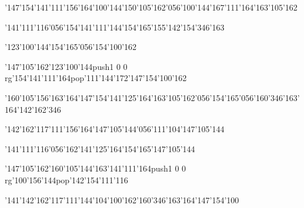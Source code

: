 \null\vfill\ipa\centerline{\enskip\char'147\char'154\char'141\char'111\char'156\char'164\enskip\char'100\char'144\enskip\char'150\char'105\char'162\char'056\char'100\char'144\enskip\enskip\enskip\char'167\char'111\char'164\enskip\char'163\char'105\char'162}\medskip\centerline{\enskip\char'141\char'111\char'116\char'056\char'154\char'141\char'111\char'144\enskip\enskip\enskip\enskip\char'154\char'165\char'155\enskip\enskip\enskip\enskip\enskip\char'142\char'154\char'346\char'163}\medskip\centerline{\enskip\char'123\char'100\char'144\enskip\enskip\enskip\enskip\enskip\enskip\enskip\enskip\enskip\char'154\char'165\char'056\char'154\char'100\char'162}\medskip\centerline{\enskip\enskip\enskip\enskip\char'147\char'105\char'162\enskip\char'123\char'100\char'144\enskip\pdfcolorstack\match push{1 0 0 rg}\char'154\char'141\char'111\char'164\pdfcolorstack\match pop{}\enskip\char'111\char'144\char'172\enskip\char'147\char'154\char'100\char'162}\medskip\centerline{\enskip\enskip\char'160\char'105\char'156\char'163\char'164\enskip\enskip\enskip\char'147\char'154\char'141\char'125\char'164\enskip\char'163\char'105\char'162\char'056\char'154\char'165\char'056\char'160\char'346\char'163\char'164\enskip\char'142\char'162\char'346}\medskip\vfill\footline{\hfil\tt\folio\hfil}\eject
\null\vfill\ipa\centerline{\enskip\char'142\char'162\char'117\char'111\char'156\char'164\enskip\enskip\enskip\enskip\char'147\char'105\char'144\char'056\char'111\char'104\enskip\enskip\enskip\enskip\enskip\enskip\enskip\char'147\char'105\char'144}\medskip\centerline{\enskip\char'141\char'111\char'116\char'056\char'162\char'141\char'125\char'164\enskip\char'154\char'165\enskip\char'147\char'105\char'144\enskip\enskip\enskip\enskip\enskip\enskip\enskip\enskip\enskip}\medskip\centerline{\enskip\enskip\enskip\enskip\enskip\enskip\enskip\enskip\enskip\enskip\enskip\enskip\enskip\enskip\enskip\enskip\enskip\enskip}\medskip\centerline{\enskip\enskip\enskip\enskip\char'147\char'105\char'162\enskip\char'160\char'105\char'144\enskip\char'163\char'141\char'111\char'164\enskip\pdfcolorstack\match push{1 0 0 rg}\char'100\char'156\char'144\pdfcolorstack\match pop{}\enskip\char'142\char'154\char'111\char'116}\medskip\centerline{\enskip\enskip\enskip\enskip\enskip\enskip\enskip\enskip\char'141\enskip\char'142\char'162\char'117\char'111\char'144\enskip\char'104\char'100\char'162\enskip\enskip\enskip\char'160\char'346\char'163\char'164\enskip\char'147\char'154\char'100}\medskip\vfill\footline{\hfil\tt\folio\hfil}\eject
